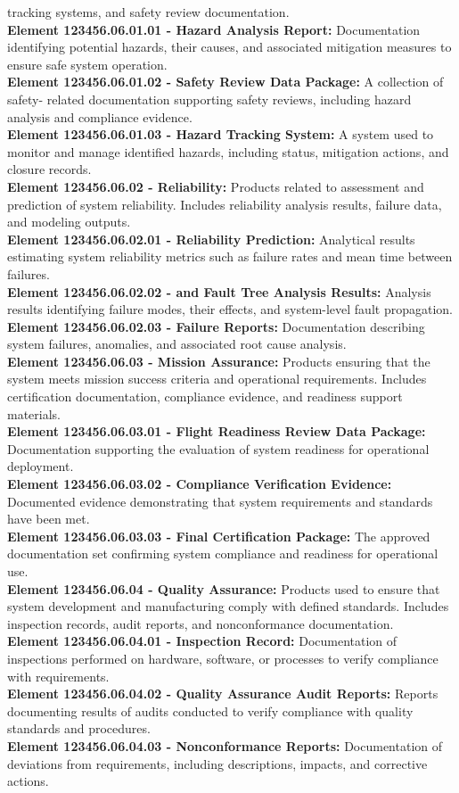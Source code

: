 tracking systems, and safety review documentation.\\
\textbf{Element 123456.06.01.01 - Hazard Analysis Report:} Documentation identifying
potential hazards, their causes, and associated mitigation measures to ensure safe
system operation.\\
\textbf{Element 123456.06.01.02 - Safety Review Data Package:} A collection of safety-
related documentation supporting safety reviews, including hazard analysis and
compliance evidence.\\
\textbf{Element 123456.06.01.03 - Hazard Tracking System:} A system used to monitor and
manage identified hazards, including status, mitigation actions, and closure records.\\
\textbf{Element 123456.06.02 - Reliability:} Products related to assessment and prediction
of system reliability. Includes reliability analysis results, failure data, and modeling
outputs.\\
\textbf{Element 123456.06.02.01 - Reliability Prediction:} Analytical results estimating
system reliability metrics such as failure rates and mean time between failures.\\
\textbf{Element 123456.06.02.02 -  and Fault Tree Analysis Results:} Analysis results
identifying failure modes, their effects, and system-level fault propagation.\\
\textbf{Element 123456.06.02.03 - Failure Reports:} Documentation describing system
failures, anomalies, and associated root cause analysis.\\
\textbf{Element 123456.06.03 - Mission Assurance:} Products ensuring that the system
meets mission success criteria and operational requirements. Includes certification
documentation, compliance evidence, and readiness support materials.\\
\textbf{Element 123456.06.03.01 - Flight Readiness Review Data Package:} Documentation
supporting the evaluation of system readiness for operational deployment.\\
\textbf{Element 123456.06.03.02 - Compliance Verification Evidence:} Documented
evidence demonstrating that system requirements and standards have been met.\\
\textbf{Element 123456.06.03.03 - Final Certification Package:} The approved
documentation set confirming system compliance and readiness for operational use.\\
\textbf{Element 123456.06.04 - Quality Assurance:} Products used to ensure that system
development and manufacturing comply with defined standards. Includes inspection
records, audit reports, and nonconformance documentation.\\
\textbf{Element 123456.06.04.01 - Inspection Record:} Documentation of inspections
performed on hardware, software, or processes to verify compliance with
requirements.\\
\textbf{Element 123456.06.04.02 - Quality Assurance Audit Reports:} Reports documenting
results of audits conducted to verify compliance with quality standards and
procedures.\\
\textbf{Element 123456.06.04.03 - Nonconformance Reports:} Documentation of deviations
from requirements, including descriptions, impacts, and corrective actions.